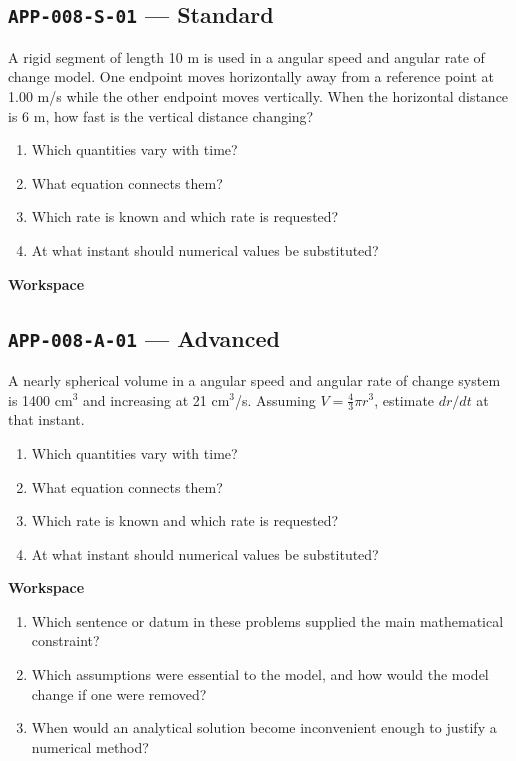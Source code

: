 \documentclass[11pt]{book}
\newcommand{\pid}[1]{\texttt{#1}}
\newcommand{\workspace}{\par\vspace{0.7in}\hrulefill\par\vspace{0.55in}\hrulefill\par}
\begin{document}
\subsection*{\pid{APP-008-S-01} — Standard}
\begin{problembox}
A rigid segment of length 10 m is used in a angular speed and angular rate of change model. One endpoint moves horizontally away from a reference point at 1.00 m/s while the other endpoint moves vertically. When the horizontal distance is 6 m, how fast is the vertical distance changing?
\end{problembox}
\begin{promptbox}\begin{enumerate}
\item Which quantities vary with time?
\item What equation connects them?
\item Which rate is known and which rate is requested?
\item At what instant should numerical values be substituted?
\end{enumerate}\end{promptbox}
\textbf{Workspace}\workspace
{}
\subsection*{\pid{APP-008-A-01} — Advanced}
\begin{problembox}
A nearly spherical volume in a angular speed and angular rate of change system is 1400 cm$^3$ and increasing at 21 cm$^3$/s. Assuming $V=\frac43\pi r^3$, estimate $dr/dt$ at that instant.
\end{problembox}
\begin{promptbox}\begin{enumerate}
\item Which quantities vary with time?
\item What equation connects them?
\item Which rate is known and which rate is requested?
\item At what instant should numerical values be substituted?
\end{enumerate}\end{promptbox}
\textbf{Workspace}\workspace
\begin{reflectionbox}\begin{enumerate}
\item Which sentence or datum in these problems supplied the main mathematical constraint?
\item Which assumptions were essential to the model, and how would the model change if one were removed?
\item When would an analytical solution become inconvenient enough to justify a numerical method?
\end{enumerate}\end{reflectionbox}
\end{document}
